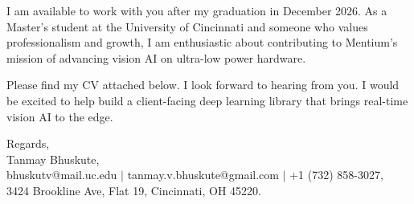 \documentclass[11pt]{letter}
\begin{document}
\begin{letter}{}
I am available to work with you after my graduation in December 2026. As a Master's student at the University of Cincinnati and someone who values professionalism and growth, I am enthusiastic about contributing to Mentium's mission of advancing vision AI on ultra-low power hardware.

Please find my CV attached below. I look forward to hearing from you. I would be excited to help build a client-facing deep learning library that brings real-time vision AI to the edge.

{\setlength{\parskip}{0pt}
Regards,\\
Tanmay Bhuskute,\\
bhuskutv@mail.uc.edu $\mid$ tanmay.v.bhuskute@gmail.com $\mid$ +1 (732) 858-3027,\\
3424 Brookline Ave, Flat 19, Cincinnati, OH 45220.
}

\end{letter}
\end{document}
